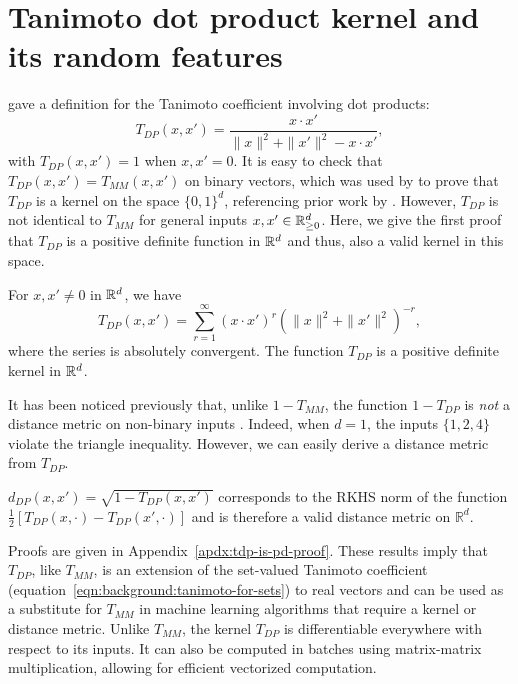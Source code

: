 \section{Tanimoto dot product kernel and its random features}\label{sec:t-dp}

\citet{ralaivola2005graph} gave a definition for the Tanimoto coefficient involving dot products:
\begin{equation}\label{eqn:tanidot-kernel}
    T_{DP}(x, x') = \frac{x\cdot x'}{\|x\|^2+\|x'\|^2-x\cdot x'},
\end{equation}
with $T_{DP}(x,x')=1$ when $x,x'=0$. It is easy to check that $T_{DP}(x,x')=T_{MM}(x,x')$ on binary vectors, which was used by \citet{ralaivola2005graph} to prove that $T_{DP}$ is a kernel on the space $\{0,1\}^d$, referencing prior work by \citet{gower1971general}.  However, $T_{DP}$ is not identical to $T_{MM}$ for general inputs $x,x'\in \mathbb{R}_{\ge 0}^d$. Here, we give the first proof that $T_{DP}$ is a positive definite function in $\mathbb{R}^d$ and thus, also a valid kernel in this space.

\begin{theorem}\label{thm:tdp-is-pd}
    For $x,x'\neq 0$ in $\mathbb{R}^d$, we have
    \begin{equation}\label{eqn:tanidot-power-series}
       T_{DP}(x,x')= \sum_{r=1}^\infty \left(x\cdot x'\right)^r \left(\|x\|^2+\|x'\|^2\right)^{-r},
    \end{equation}
    where the series is absolutely convergent. The function $T_{DP}$ is a positive definite kernel in $\mathbb{R}^d$.
\end{theorem}

It has been noticed previously that, unlike $1-T_{MM}$, the function $1-T_{DP}$ is \emph{not} a distance metric on non-binary inputs \citep{kosub2019note}. Indeed, when $d=1$, the inputs $\{1,2,4\}$   violate the triangle inequality. However, we can easily derive a distance metric from $T_{DP}$.

\begin{corollary}\label{thm:tdp-is-metric}
    $d_{DP}(x,x')=\sqrt{1-T_{DP}(x,x')}$ 
    corresponds to the RKHS norm of the function $\frac{1}{2}[T_{DP}(x,\cdot)-T_{DP}(x',\cdot)]$
    and is therefore a valid distance metric on $\mathbb{R}^d$.
\end{corollary}

Proofs are given in Appendix~\ref{apdx:tdp-is-pd-proof}. These results imply that $T_{DP}$, like $T_{MM}$, is an extension of the set-valued Tanimoto coefficient
(equation~\ref{eqn:background:tanimoto-for-sets})
to real vectors and can be used as a substitute for $T_{MM}$ in machine learning algorithms that require a kernel or distance metric. Unlike $T_{MM}$, the kernel $T_{DP}$
is differentiable everywhere with respect to its inputs.
It can also be computed in batches using matrix-matrix multiplication,
allowing for efficient vectorized computation.

